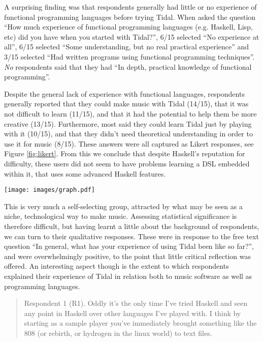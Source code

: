 \documentclass[authoryear,preprint]{sigplanconf}
\begin{document}
A surprising finding was that respondents generally had little or no
experience of functional programming languages before trying
Tidal. When asked the question ``How much experience of functional
programming languages (e.g. Haskell, Lisp, etc) did you have when you
started with Tidal?'', 6/15 selected ``No experience at all'', 6/15
selected ``Some understanding, but no real practical experience'' and
3/15 selected ``Had written programs using functional programming
techniques''. \emph{No} respondents said that they had ``In depth,
practical knowledge of functional programming''.

Despite the general lack of experience with functional languages,
respondents generally reported that they could make music with Tidal
(14/15), that it was not difficult to learn (11/15), and that it had
the potential to help them be more creative (13/15). Furthermore, most
said they could learn Tidal just by playing with it (10/15), and that
they didn't need theoretical understanding in order to use it for
music (8/15). These answers were all captured as Likert responses, see
Figure \ref{fig:likert}. From this we conclude that despite Haskell's
reputation for difficulty, these users did not seem to have problems
learning a DSL embedded within it, that uses some advanced Haskell
features.

\begin{figure*}[t]
    \centering
    \texttt{[image: images/graph.pdf]}
    \caption{Likert scale questions from survey of Tidal users}
    \label{fig:likert}
\end{figure*}

This is very much a self-selecting group, attracted by what may be
seen as a niche, technological way to make music. Assessing
statistical significance is therefore difficult, but having learnt a
little about the background of respondents, we can turn to their
qualitative responses. These were in response to the free text
question ``In general, what has your experience of using Tidal been
like so far?'', and were overwhelmingly positive, to the point that
little critical reflection was offered. An interesting aspect though
is the extent to which respondents explained their experience of Tidal
in relation both to music software as well as programming languages.

\begin{quotation}
Respondent 1 (R1). Oddly it's the only time I've tried Haskell and
seen any point in Haskell over other languages I've played with.  I
think by starting as a sample player you've immediately brought
something like the 808 (or rebirth, or hydrogen in the linux world) to
text files.
\end{quotation}
\end{document}
